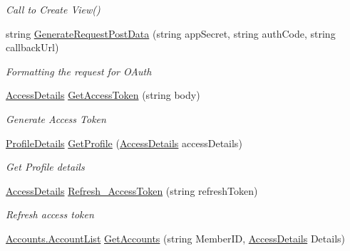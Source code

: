 \begin{DoxyCompactItemize}
\begin{DoxyCompactList}\small\item\em Call to Create View() \end{DoxyCompactList}\item 
string \mbox{\hyperlink{class_vsts_demo_builder_1_1_controllers_1_1_environment_controller_ac983d0c1775718689aff6f7a17c0b929}{Generate\+Request\+Post\+Data}} (string app\+Secret, string auth\+Code, string callback\+Url)
\begin{DoxyCompactList}\small\item\em Formatting the request for O\+Auth \end{DoxyCompactList}\item 
\mbox{\hyperlink{class_vsts_demo_builder_1_1_models_1_1_access_details}{Access\+Details}} \mbox{\hyperlink{class_vsts_demo_builder_1_1_controllers_1_1_environment_controller_a9726501c86319171adf04dedab87a6a0}{Get\+Access\+Token}} (string body)
\begin{DoxyCompactList}\small\item\em Generate Access Token \end{DoxyCompactList}\item 
\mbox{\hyperlink{class_vsts_demo_builder_1_1_models_1_1_profile_details}{Profile\+Details}} \mbox{\hyperlink{class_vsts_demo_builder_1_1_controllers_1_1_environment_controller_a8d6dfbb168d7d87651c361e953feb9d9}{Get\+Profile}} (\mbox{\hyperlink{class_vsts_demo_builder_1_1_models_1_1_access_details}{Access\+Details}} access\+Details)
\begin{DoxyCompactList}\small\item\em Get Profile details \end{DoxyCompactList}\item 
\mbox{\hyperlink{class_vsts_demo_builder_1_1_models_1_1_access_details}{Access\+Details}} \mbox{\hyperlink{class_vsts_demo_builder_1_1_controllers_1_1_environment_controller_a8c1a9720f499884448fa692a6fc8b514}{Refresh\+\_\+\+Access\+Token}} (string refresh\+Token)
\begin{DoxyCompactList}\small\item\em Refresh access token \end{DoxyCompactList}\item 
\mbox{\hyperlink{class_vsts_demo_builder_1_1_models_1_1_accounts_1_1_account_list}{Accounts.\+Account\+List}} \mbox{\hyperlink{class_vsts_demo_builder_1_1_controllers_1_1_environment_controller_af9d72d23dec7248e6a8b5106209e6e6d}{Get\+Accounts}} (string Member\+ID, \mbox{\hyperlink{class_vsts_demo_builder_1_1_models_1_1_access_details}{Access\+Details}} Details)

\end{DoxyCompactItemize}
